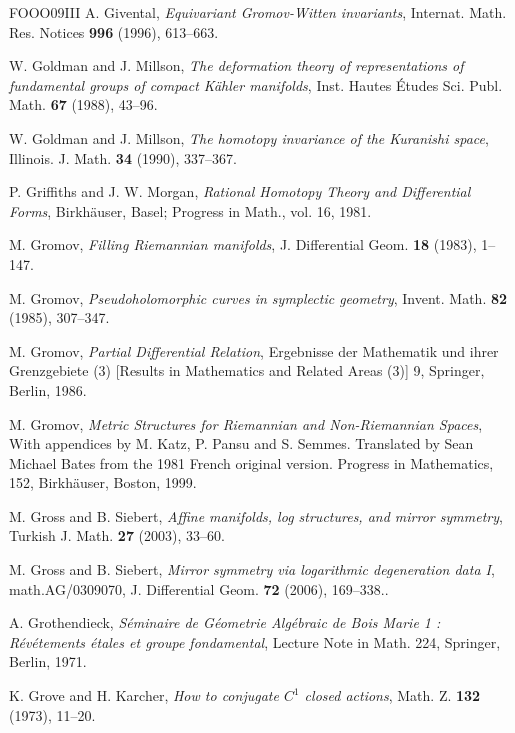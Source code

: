 \begin{thebibliography}{FOOO09III}
 A. Givental, \emph{Equivariant Gromov-Witten invariants}, Internat. Math. Res. Notices \textbf{996} (1996), 613–663.

 W. Goldman and J. Millson, \emph{The deformation theory of representations of fundamental groups of compact Kähler manifolds}, Inst. Hautes Études Sci. Publ. Math. \textbf{67} (1988), 43–96.

 W. Goldman and J. Millson, \emph{The homotopy invariance of the Kuranishi space}, Illinois. J. Math. \textbf{34} (1990), 337–367.

 P. Griffiths and J. W. Morgan, \emph{Rational Homotopy Theory and Differential Forms}, Birkhäuser, Basel; Progress in Math., vol. 16, 1981.

 M. Gromov, \emph{Filling Riemannian manifolds}, J. Differential Geom. \textbf{18} (1983), 1–147.

 M. Gromov, \emph{Pseudoholomorphic curves in symplectic geometry}, Invent. Math. \textbf{82} (1985), 307–347.

 M. Gromov, \emph{Partial Differential Relation}, Ergebnisse der Mathematik und ihrer Grenzgebiete (3) [Results in Mathematics and Related Areas (3)] 9, Springer, Berlin, 1986.

 M. Gromov, \emph{Metric Structures for Riemannian and Non-Riemannian Spaces}, With appendices by M. Katz, P. Pansu and S. Semmes. Translated by Sean Michael Bates from the 1981 French original version. Progress in Mathematics, 152, Birkhäuser, Boston, 1999.

 M. Gross and B. Siebert, \emph{Affine manifolds, log structures, and mirror symmetry}, Turkish J. Math. \textbf{27} (2003), 33–60.

 M. Gross and B. Siebert, \emph{Mirror symmetry via logarithmic degeneration data I}, math.AG/0309070, J. Differential Geom. \textbf{72} (2006), 169–338..

 A. Grothendieck, \emph{Séminaire de Géometrie Algébraic de Bois Marie 1 : Révétements étales et groupe fondamental}, Lecture Note in Math. 224, Springer, Berlin, 1971.

 K. Grove and H. Karcher, \emph{How to conjugate \(C^1\) closed actions}, Math. Z. \textbf{132} (1973), 11–20.


\end{thebibliography}
